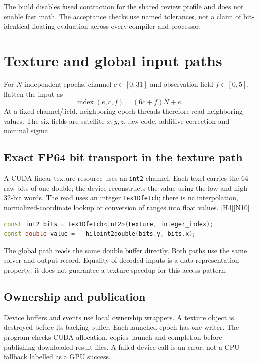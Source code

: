 \documentclass[11pt,a4paper]{article}
\newcommand{\code}[1]{\texttt{#1}}
\newcommand{\ext}[1]{\textcolor{muted}{[#1]}}
\newcommand{\dec}[1]{\textcolor{accent}{[N#1]}}
\begin{document}
The build disables fused contraction for the shared review profile and does not enable
fast math. The acceptance checks use named tolerances, not a claim of bit-identical
floating evaluation across every compiler and processor.
\clearpage

\section{Texture and global input paths}
For $N$ independent epochs, channel $c\in[0,31]$ and observation field $f\in[0,5]$,
flatten the input as
\begin{equation}
\operatorname{index}(e,c,f)=(6c+f)N+e.
\end{equation}
At a fixed channel/field, neighboring epoch threads therefore read neighboring values.
The six fields are satellite $x,y,z$, raw code, additive correction and nominal sigma.

\subsection{Exact FP64 bit transport in the texture path}
A CUDA linear texture resource uses an \code{int2} channel. Each texel carries the
64 raw bits of one double; the device reconstructs the value using the low and high
32-bit words. The read uses an integer \code{tex1Dfetch}; there is no interpolation,
normalized-coordinate lookup or conversion of ranges into float values.
\ext{H4}\dec{10}

\begin{lstlisting}[language=C++]
const int2 bits = tex1Dfetch<int2>(texture, integer_index);
const double value = __hiloint2double(bits.y, bits.x);
\end{lstlisting}
The global path reads the same double buffer directly. Both paths use the same solver
and output record. Equality of decoded inputs is a data-representation property; it
does not guarantee a texture speedup for this access pattern.

\subsection{Ownership and publication}
Device buffers and events use local ownership wrappers. A texture object is destroyed
before its backing buffer. Each launched epoch has one writer. The program checks CUDA
allocation, copies, launch and completion before publishing downloaded result files.
A failed device call is an error, not a CPU fallback labelled as a GPU success.
\end{document}
